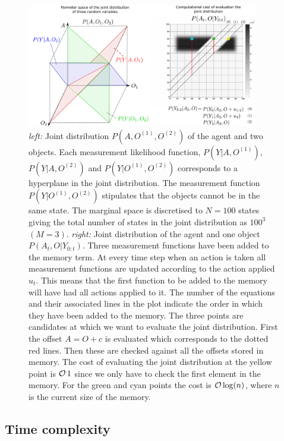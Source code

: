 \begin{figure}
 \centering
  \includegraphics[width=0.9\textwidth]{./ch5-MLMF/Figures/Figure8.pdf}
  \caption{\textit{left:} Joint distribution $P(A,O^{(1)},O^{(2)})$ of the agent and two objects. Each measurement likelihood function, $P(Y|A,O^{(1)})$, 
  $P(Y|A,O^{(2)})$ and $P(Y|O^{(1)},O^{(2)})$ corresponds to a hyperplane in the joint distribution. The measurement function $P(Y|O^{(1)},O^{(2)})$ 
  stipulates that the objects cannot be in the same state. The marginal space is discretised to $N = 100$ states giving the total number of states in 
  the joint distribution as $100^3$ $(M=3)$. \textit{right:} Joint distribution of the agent and one object $P(A_t,O|Y_{0:t})$. Three measurement 
  functions have been added to the memory term. At every time step when an action is taken all measurement functions are updated according to 
  the action applied $u_t$. This means that the first function to be added to the memory will have had all actions applied to it. The number 
  of the equations and their associated lines in the plot indicate the order in which they have been added to the memory. 
  The three points are candidates at which we want to evaluate the joint distribution. First the offset $A=O+c$
  is evaluated which corresponds to the dotted red lines. Then these are checked against all the offsets stored in memory. The cost of evaluating
  the joint distribution at the yellow point is $\operatorname{\mathcal{O}}{1}$ since we only have to check the first element in the memory. For the green and cyan points the 
  cost is $\operatorname{\mathcal{O}}{\log(n)}$, where $n$ is the current size of the memory.}
  \label{fig:3bel_lik_profile}
\end{figure}

\subsection{Time complexity}

